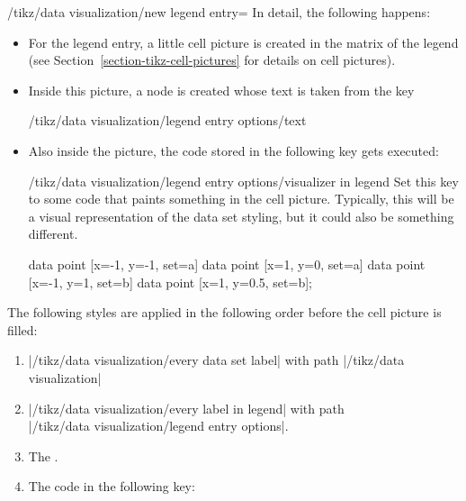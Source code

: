 \begin{key}{/tikz/data visualization/new legend entry=}
    In detail, the following happens:
    \begin{itemize}
        \item For the legend entry, a little cell picture is created in the
            matrix of the legend (see Section~\ref{section-tikz-cell-pictures}
            for details on cell pictures).
        \item Inside this picture, a node is created whose text is taken from
            the key
\begin{codeexample}
/tikz/data visualization/legend entry options/text
\end{codeexample}
        \item Also inside the picture, the code stored in the following key
            gets executed:
            \begin{key}{/tikz/data visualization/legend entry options/visualizer in legend}
                Set this key to some code that paints something in the cell
                picture. Typically, this will be a visual representation of the
                data set styling, but it could also be something different.
\begin{codeexample}[width=6cm,preamble={\usetikzlibrary{datavisualization}}]
\tikz \datavisualization [
  school book axes, visualize as line/.list={a,b},
  style sheet=vary dashing,
  a={label in legend={text=a}},
  new legend entry={
    text=spacer,
    visualizer in legend={\draw[solid] (0,0) circle[radius=2pt];}
  },
  b={label in legend={text=b}}]
data point [x=-1, y=-1, set=a]   data point [x=1, y=0, set=a]
data point [x=-1, y=1,  set=b]   data point [x=1, y=0.5, set=b];
\end{codeexample}
            \end{key}
    \end{itemize}
    The following styles are applied in the following order before the cell
    picture is filled:
    \begin{enumerate}
        \item |/tikz/data visualization/every data set label| with path
            |/tikz/data visualization|
        \item |/tikz/data visualization/every label in legend| with path\\
            |/tikz/data visualization/legend entry options|.
        \item The .
        \item The code in the following key:

\end{enumerate}
\end{key}
